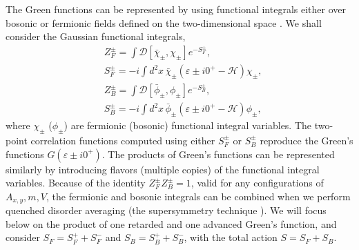 \documentclass[aps,pra,reprint,superscriptaddress,showkeys,amsmath,amssymb,longbibliography]{revtex4-1}
\begin{document}
The Green functions can be represented by using functional integrals either over bosonic or fermionic fields defined on the two-dimensional space \cite{Efetov:1997fw}.
We shall consider the Gaussian functional integrals,
\begin{align}
  &
  Z_{F}^{\pm}
    =\int \mathcal{D}\left[\bar{\chi}_{\pm}, \chi_{\pm}\right]
    e^{ - S^{\pm}_F},
    \nonumber \\
  &
    S_F^{\pm}
    =
    -{i} \int d^2x\, \bar{\chi}_{\pm}
    \left(\varepsilon\pm {i} 0^+-\mathcal{H}\right) \chi_{\pm},
    \nonumber \\
  &
  Z_{B}^{\pm}
    =\int \mathcal{D}\left[\bar{\phi}_{\pm}, \phi_{\pm}\right]
    e^{ - S_B^{\pm}},
    \nonumber \\
  &
  S^{\pm}_B =
    -{i} \int d^2x\, \bar{\phi}_{\pm}
    \left(\varepsilon\pm {i}0^+-\mathcal{H}\right) \phi_{\pm},
\end{align}
where $\chi_{\pm}$ ($\phi_{\pm}$) are fermionic (bosonic) functional integral variables. 
The two-point correlation functions computed using either $S^{\pm}_{F}$ or $S^{\pm}_B$ reproduce the Green's functions $G(\varepsilon\pm i 0^+)$.
The products of Green's functions can be represented similarly by introducing flavors (multiple copies) of the functional integral variables.
Because of the identity $Z^{\pm}_F Z^{\pm}_{B} =1$, valid for any configurations of $A_{x,y}, m, V$, the fermionic and bosonic integrals can be combined when we perform quenched disorder averaging (the supersymmetry technique \cite{Efetov:1997fw}).
We will focus below on the product of one retarded and one advanced Green's function, and consider $S_F= S^+_F + S^-_F$ and $S_B= S^+_B + S^-_B$, with the total action $S=S_F+S_B$.
\end{document}
